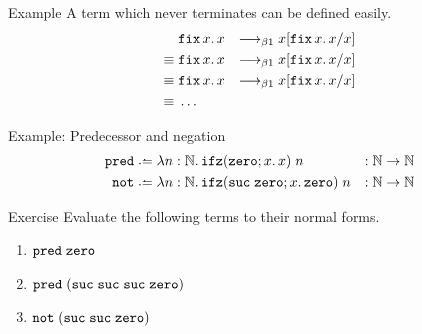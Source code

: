 \begin{frame}{Example}
  A term which never terminates can be defined easily.
  \begin{align*}
             & \mathtt{fix}\,x.\,x & \longrightarrow_{\beta1} x[{\mathtt{fix}\,x.\,x}/{x}] \\
    \equiv{} & \mathtt{fix}\,x.\,x & \longrightarrow_{\beta1} x[{\mathtt{fix}\,x.\,x}/{x}] \\
    \equiv{} & \mathtt{fix}\,x.\,x & \longrightarrow_{\beta1} x[{\mathtt{fix}\,x.\,x}/{x}] \\
    \equiv{} & \dots
  \end{align*}
\end{frame}

\begin{frame}{Example: Predecessor and negation}
  \begin{align*}
    \pred & \defeq \lambda n : \mathbb{N}.\,\ifz(\zero; x.\, x)\;n & : \mathbb{N} \to \mathbb{N} \\
               \mathtt{not} & \defeq \lambda n : \mathbb{N}.\, \ifz(\suc\;\zero; x.\, \zero)\; n & : \mathbb{N} \to \mathbb{N}
  \end{align*}
  \begin{block}{Exercise}
    Evaluate the following terms to their normal forms.
    \begin{enumerate}
      \item $\mathtt{pred}\;\mathtt{zero}$
      \item $\mathtt{pred}\;(\mathtt{suc}\;\mathtt{suc}\;\mathtt{suc}\;\mathtt{zero})$
      \item $\mathtt{not}\;(\mathtt{suc}\;\mathtt{suc}\;\mathtt{zero})$
    \end{enumerate}
    
  \end{block}
\end{frame}

